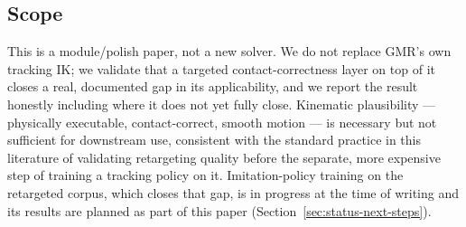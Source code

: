 \subsection{Scope}
\label{sec:scope}

This is a module/polish paper, not a new solver. We do not replace GMR's own
tracking IK; we validate that a targeted contact-correctness layer on top of
it closes a real, documented gap in its applicability, and we report the
result honestly including where it does not yet fully close. Kinematic
plausibility --- physically executable, contact-correct, smooth motion ---
is necessary but not sufficient for downstream use, consistent with the
standard practice in this literature of validating retargeting quality
before the separate, more expensive step of training a tracking policy on
it. Imitation-policy training on the retargeted corpus, which closes that
gap, is in progress at the time of writing and its results are planned as
part of this paper (Section~\ref{sec:status-next-steps}).
